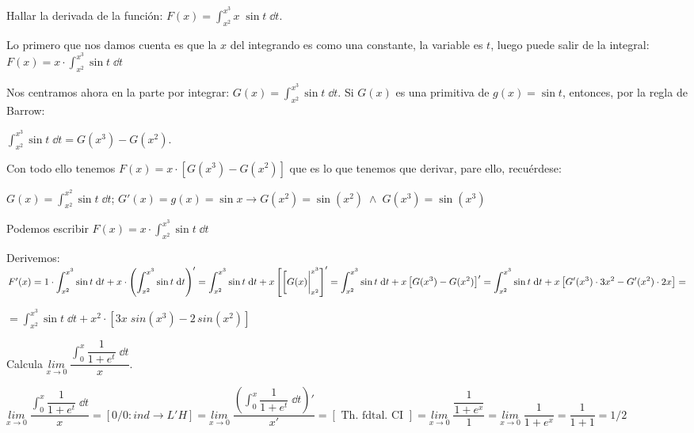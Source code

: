 \begin{ejre}
	Hallar la derivada de la función: $\displaystyle F(x)=\int_{x^2}^{x^3} x \; \sin t \; \dd t$.
\end{ejre}
\begin{proofw}\renewcommand{\qedsymbol}{$\diamond$}	

Lo primero que nos damos cuenta es que la $x$ del integrando es como una constante, la variable es $t$, luego puede salir de la integral:  $\displaystyle F(x)=x \cdot \int_{x^2}^{x^3} \sin t \; \dd t$

Nos centramos ahora en la parte por integrar: $\displaystyle G(x)=\int_{x^2}^{x^3}  \sin t \; \dd t$. Si $G(x)$ es una primitiva de $g(x)=\sin t$, entonces, por la regla de Barrow:
 
$\displaystyle \int_{x^2}^{x^3}  \sin t \; \dd t = G(x^3)-G(x^2)$.	

Con todo ello tenemos $F(x)=\displaystyle x\cdot [G(x^3)-G(x^2)]$ que es lo que tenemos que derivar, pare ello, recuérdese:

$\displaystyle G(x)=\int_{x^2}^{x^2} \sin t \; \dd t$; $G'(x)=g(x)=\sin x \to G(x^2)=\sin(x^2) \; \wedge \; G(x^3)=\sin(x^3)$

Podemos escribir $\displaystyle F(x)=x\cdot \int_{x^2}^{x^3} \sin t \; \dd t$ 

Derivemos: $F'(x)=\displaystyle 1 \cdot \int_{x^2}^{x^3} \sin t \; \dd t + x \cdot \left(\int_{x^2}^{x^3} \sin t \; \dd t \right)'= \int_{x^2}^{x^3} \sin t \; \dd t + x \left[ \eval[G(x)|_{x^2}^{x^3} \right]'= \int_{x^2}^{x^3} \sin t \; \dd t + x \left[G(x^3)-G(x^2) \right]'= \int_{x^2}^{x^3} \sin t \; \dd t + x \left[G'(x^3)\cdot 3x^2 - G'(x^2)\cdot 2x \right]=$

$\displaystyle =
\int_{x^2}^{x^3} \sin t \; \dd t + x^2 \cdot \left[3x \; sin(x^3)- 2\, sin(x^2) \right]$

\end{proofw}


\begin{ejre}
Calcula $\displaystyle \underset {x\to 0}{lim}\; {\dfrac {\displaystyle \int_0^x \dfrac {1}{1+e^t}\; \dd t }{x}}$.	

\end{ejre}

\begin{proofw}\renewcommand{\qedsymbol}{$\diamond$}	


$\displaystyle \underset {x\to 0}{lim}\; {\dfrac {\displaystyle \int_0^x \dfrac {1}{1+e^t}\; \dd t }{x}}= [0/0: ind \to L'H] =\displaystyle \underset {x\to 0}{lim}\; { \dfrac {\left( \displaystyle \int_0^x \dfrac {1}{1+e^t}\; \dd t \right)'}{x'}}= [\text{ Th. fdtal. CI }]= \underset{x\to 0}{lim}\;{\dfrac { \dfrac {1}{1+e^x} }{1}}= \underset{x\to 0}{lim}\;{\dfrac {1}{1+e^x}}=\dfrac {1}{1+1}= 1/2$	

\end{proofw}



